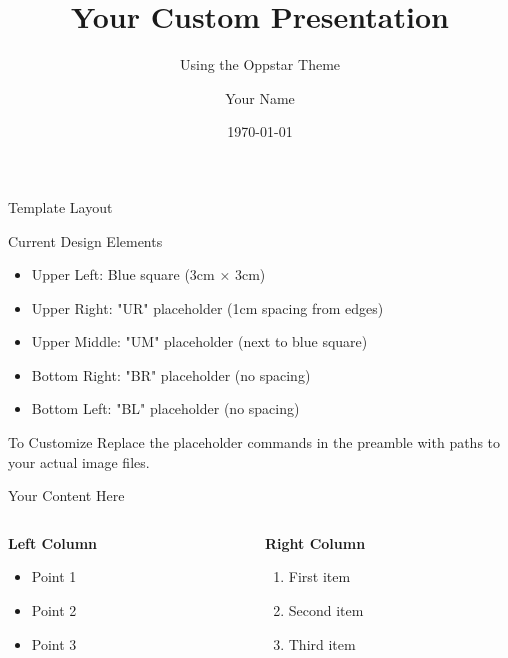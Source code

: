\documentclass[aspectratio=169]{beamer}
\title{Your Custom Presentation}
\subtitle{Using the Oppstar Theme}
\author{Your Name}
\institute{Your Organization}
\date{\today}
\begin{document}
\oppstartitlepage

\begin{frame}{Template Layout}
  \begin{block}{Current Design Elements}
    \begin{itemize}
      \item Upper Left: Blue square (3cm × 3cm)
      \item Upper Right: "UR" placeholder (1cm spacing from edges)
      \item Upper Middle: "UM" placeholder (next to blue square)
      \item Bottom Right: "BR" placeholder (no spacing)
      \item Bottom Left: "BL" placeholder (no spacing)
    \end{itemize}
  \end{block}

  \begin{alertblock}{To Customize}
    Replace the placeholder commands in the preamble with paths to your actual image files.
  \end{alertblock}
\end{frame}

\begin{frame}{Your Content Here}
  \begin{columns}
    \begin{column}{0.5\textwidth}
      \textbf{Left Column}
      \begin{itemize}
        \item Point 1
        \item Point 2
        \item Point 3
      \end{itemize}
    \end{column}
    \begin{column}{0.5\textwidth}
      \textbf{Right Column}
      \begin{enumerate}
        \item First item
        \item Second item
        \item Third item
      \end{enumerate}
    \end{column}
  \end{columns}
\end{frame}
\end{document}

